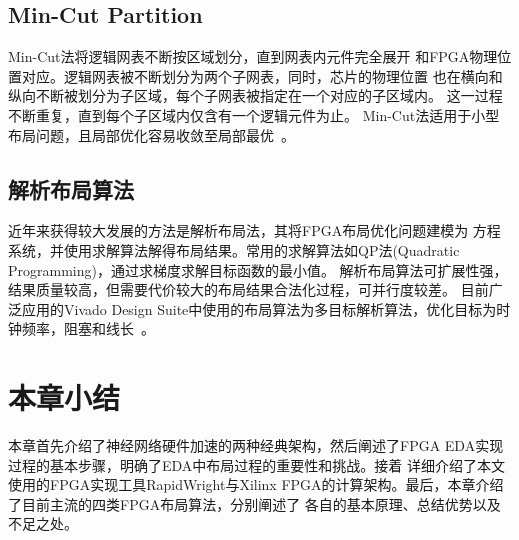 \subsection{Min-Cut Partition}
Min-Cut法将逻辑网表不断按区域划分，直到网表内元件完全展开
和FPGA物理位置对应。逻辑网表被不断划分为两个子网表，同时，芯片的物理位置
也在横向和纵向不断被划分为子区域，每个子网表被指定在一个对应的子区域内。
这一过程不断重复，直到每个子区域内仅含有一个逻辑元件为止。
Min-Cut法适用于小型布局问题，且局部优化容易收敛至局部最优~\cite{lee2008fpga}。

\subsection{解析布局算法}
近年来获得较大发展的方法是解析布局法，其将FPGA布局优化问题建模为
方程系统，并使用求解算法解得布局结果。常用的求解算法如QP法(Quadratic Programming)，通过求梯度求解目标函数的最小值。
解析布局算法可扩展性强，结果质量较高，但需要代价较大的布局结果合法化过程，可并行度较差。
目前广泛应用的Vivado Design Suite中使用的布局算法为多目标解析算法，优化目标为时钟频率，阻塞和线长~\cite{wp416-vivado-user-guide}。



\section{本章小结}

本章首先介绍了神经网络硬件加速的两种经典架构，然后阐述了FPGA EDA实现过程的基本步骤，明确了EDA中布局过程的重要性和挑战。接着
详细介绍了本文使用的FPGA实现工具RapidWright与Xilinx FPGA的计算架构。最后，本章介绍了目前主流的四类FPGA布局算法，分别阐述了
各自的基本原理、总结优势以及不足之处。


































































